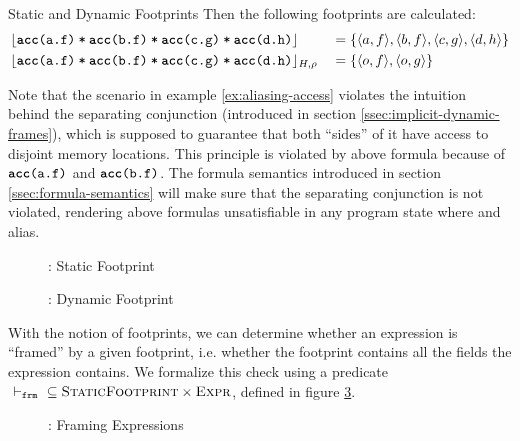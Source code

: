 \begin{description}
\begin{example}{Static and Dynamic Footprints}
        Then the following footprints are calculated:
        \begin{alignat*}{2}
        & \staticFP
        {\phiCons{\phiCons{\phiAcc{a}{f}}{\phiAcc{b}{f}}}{\phiCons{\phiAcc{c}{g}}{\phiAcc{d}{h}}}} 
        &&= \{ \langle a, f \rangle, \langle b, f \rangle, \langle c, g \rangle, \langle d, h \rangle \}\\
        & \dynamicFP{H}{\rho}
        {\phiCons{\phiCons{\phiAcc{a}{f}}{\phiAcc{b}{f}}}{\phiCons{\phiAcc{c}{g}}{\phiAcc{d}{h}}}} 
        &&= \{ \langle o, f \rangle, \langle o, g \rangle \}
        \end{alignat*}
    \end{example}
    
    Note that the scenario in example \ref{ex:aliasing-access} violates the intuition behind the separating conjunction (introduced in section \ref{ssec:implicit-dynamic-frames}), which is supposed to guarantee that both “sides” of it have access to disjoint memory locations.
    This principle is violated by above formula because of $\phiAcc{a}{f}$ and $\phiAcc{b}{f}$.
    The formula semantics introduced in section \ref{ssec:formula-semantics} will make sure that the separating conjunction is not violated, rendering above formulas unsatisfiable in any program state where  and  alias.
\end{description}
\begin{figure}[h]
    
    \caption{\svlidf: Static Footprint}
    \label{fig:sfp}
\end{figure}
\begin{figure}[h]
    
    \caption{\svlidf: Dynamic Footprint}
    \label{fig:dfp}
\end{figure}

With the notion of footprints, we can determine whether an expression is “framed” by a given footprint, i.e. whether the footprint contains all the fields the expression contains.
We formalize this check using a predicate $\sfrme \subseteq \setSFootprint \times \setExpr$, defined in figure \ref{fig:svl-frme}.
\begin{figure}
    
    \caption{\svlidf: Framing Expressions}
    \label{fig:svl-frme}
\end{figure}

